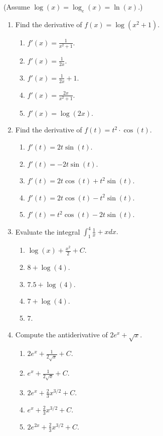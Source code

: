 \documentclass{article}
\begin{document}
(Assume \(\log(x)=\log_e(x)=\ln(x)\).)


\begin{enumerate}


  \item Find the derivative of $f(x)=\log(x^2+1).$
  \begin{enumerate}
    \item $f'(x)=\frac{1}{x^2+1}$.
    \item $f'(x)=\frac{1}{2x}$.
    \item $f'(x)=\frac{1}{2x}+1$.
    \item $f'(x)=\frac{2x}{x^2+1}$.  %
    \item $f'(x)=\log(2x)$.
  \end{enumerate}

  \item Find the derivative of $f(t)=t^2\cdot \cos(t).$
  \begin{enumerate}
    \item $f'(t)=2t\sin(t)$.
    \item $f'(t)=-2t\sin(t)$.
    \item $f'(t)=2t\cos(t)+t^2\sin(t)$.
    \item $f'(t)=2t\cos(t)-t^2\sin(t)$.  %
    \item $f'(t)=t^2\cos(t)-2t\sin(t)$.
  \end{enumerate}
  
  \item Evaluate the integral  $\int_{1}^4\frac{1}{x}+xdx.$
  \begin{enumerate}
    \item $\log(x)+\frac{x^2}{2}+C$.
    \item $8+\log(4)$.  
    \item $7.5+\log(4)$. %
    \item $7+\log(4)$. 
    \item $7$.
  \end{enumerate}
  
  \item Compute the  antiderivative of $2e^{x}+\sqrt{x}$.
  \begin{enumerate}
    \item $2e^{x}+\frac{1}{2\sqrt{x}}+C$.
    \item $e^{x}+\frac{1}{2\sqrt{x}}+C$.
    \item $2e^{x}+\frac{2}{3}x^{3/2}+C$. %
    \item $e^{x}+\frac{2}{3}x^{3/2}+C$. 
    \item $2e^{2x}+\frac{2}{3}x^{3/2}+C$.
  \end{enumerate}
  

\end{enumerate}
\end{document}
